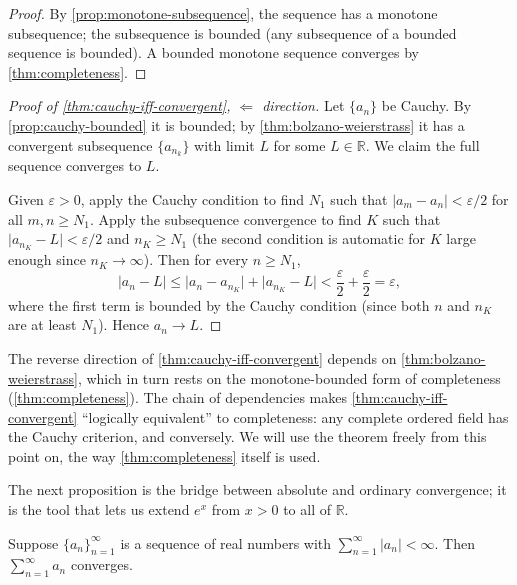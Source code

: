 \begin{proof}
By \cref{prop:monotone-subsequence}, the sequence has a monotone subsequence; the subsequence is bounded (any subsequence of a bounded sequence is bounded). A bounded monotone sequence converges by \cref{thm:completeness}.
\end{proof}

\begin{proof}[Proof of \cref{thm:cauchy-iff-convergent}, \(\Leftarrow\) direction]
Let \(\{a_{n}\}\) be Cauchy. By \cref{prop:cauchy-bounded} it is bounded; by \cref{thm:bolzano-weierstrass} it has a convergent subsequence \(\{a_{n_{k}}\}\) with limit \(L\) for some \(L \in \mathbb{R}\). We claim the full sequence converges to \(L\).

Given \(\varepsilon > 0\), apply the Cauchy condition to find \(N_{1}\) such that \(\lvert a_{m} - a_{n} \rvert < \varepsilon / 2\) for all \(m, n \geq N_{1}\). Apply the subsequence convergence to find \(K\) such that \(\lvert a_{n_{K}} - L \rvert < \varepsilon / 2\) and \(n_{K} \geq N_{1}\) (the second condition is automatic for \(K\) large enough since \(n_{K} \to \infty\)). Then for every \(n \geq N_{1}\),
\[
\lvert a_{n} - L \rvert
\leq \lvert a_{n} - a_{n_{K}} \rvert + \lvert a_{n_{K}} - L \rvert
< \frac{\varepsilon}{2} + \frac{\varepsilon}{2}
= \varepsilon,
\]
where the first term is bounded by the Cauchy condition (since both \(n\) and \(n_{K}\) are at least \(N_{1}\)). Hence \(a_{n} \to L\).
\end{proof}

\begin{caution}
The reverse direction of \cref{thm:cauchy-iff-convergent} depends on \cref{thm:bolzano-weierstrass}, which in turn rests on the monotone-bounded form of completeness (\cref{thm:completeness}). The chain of dependencies makes \cref{thm:cauchy-iff-convergent} ``logically equivalent'' to completeness: any complete ordered field has the Cauchy criterion, and conversely. We will use the theorem freely from this point on, the way \cref{thm:completeness} itself is used.
\end{caution}

The next proposition is the bridge between absolute and ordinary convergence; it is the tool that lets us extend \(e^{x}\) from \(x > 0\) to all of \(\mathbb{R}\).

\begin{proposition}\label{prop:abs-conv-implies-conv}
Suppose \(\{a_{n}\}_{n = 1}^{\infty}\) is a sequence of real numbers with \(\sum_{n = 1}^{\infty} \lvert a_{n} \rvert < \infty\). Then \(\sum_{n = 1}^{\infty} a_{n}\) converges.
\end{proposition}

